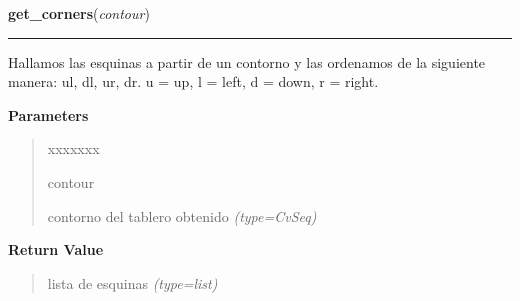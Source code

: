     \label{src:search_goban:get_corners}

    \vspace{0.5ex}

\hspace{.8\funcindent}\begin{boxedminipage}{\funcwidth}

    \raggedright \textbf{get\_corners}(\textit{contour})

    \vspace{-1.5ex}

    \rule{\textwidth}{0.5\fboxrule}
\setlength{\parskip}{2ex}
Hallamos las esquinas a partir de un contorno y las ordenamos de la siguiente manera: ul, dl, ur, dr.  u = up, l = left, d = down, r = right.

\setlength{\parskip}{1ex}
      \textbf{Parameters}
      \vspace{-1ex}

      \begin{quote}
        \begin{Ventry}{xxxxxxx}

          \item[contour]


contorno del tablero obtenido
            {\it (type=CvSeq)}

        \end{Ventry}

      \end{quote}

      \textbf{Return Value}
    \vspace{-1ex}

      \begin{quote}

lista de esquinas
      {\it (type=list)}

      \end{quote}

    \end{boxedminipage}

    \label{src:search_goban:filter_image}

    \vspace{0.5ex}

